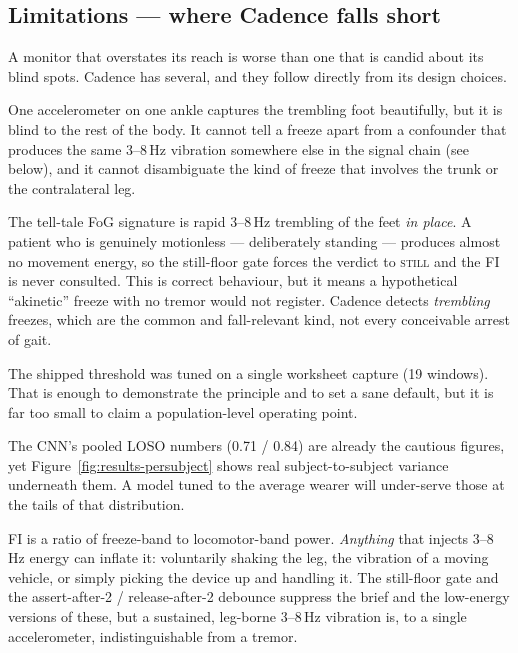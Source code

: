 \subsection{Limitations --- where Cadence falls short}

A monitor that overstates its reach is worse than one that is candid about its blind
spots. Cadence has several, and they follow directly from its design choices.

\begin{description}[leftmargin=1.2em,style=nextline]
\item[A single ankle sensor sees one thing.] One accelerometer on one ankle captures
the trembling foot beautifully, but it is blind to the rest of the body. It cannot tell
a freeze apart from a confounder that produces the same 3--8\,Hz vibration somewhere
else in the signal chain (see below), and it cannot disambiguate the kind of freeze
that involves the trunk or the contralateral leg.
\item[Standing still is not a freeze.] The tell-tale FoG signature is rapid 3--8\,Hz
trembling of the feet \emph{in place}. A patient who is genuinely motionless ---
deliberately standing --- produces almost no movement energy, so the still-floor gate
forces the verdict to \textsc{still} and the FI is never consulted. This is correct
behaviour, but it means a hypothetical ``akinetic'' freeze with no tremor would not
register. Cadence detects \emph{trembling} freezes, which are the common and
fall-relevant kind, not every conceivable arrest of gait.
\item[A small, personal dataset.] The shipped threshold was tuned on a single
worksheet capture (19 windows). That is enough to demonstrate the principle and to set
a sane default, but it is far too small to claim a population-level operating point.
\item[The LOSO generalisation gap.] The CNN's pooled LOSO numbers (0.71 / 0.84) are
already the cautious figures, yet Figure~\ref{fig:results-persubject} shows real
subject-to-subject variance underneath them. A model tuned to the average wearer will
under-serve those at the tails of that distribution.
\item[The Freeze Index has confounders.] FI is a ratio of freeze-band to locomotor-band
power. \emph{Anything} that injects 3--8\,Hz energy can inflate it: voluntarily shaking
the leg, the vibration of a moving vehicle, or simply picking the device up and handling
it. The still-floor gate and the assert-after-2 / release-after-2 debounce suppress the
brief and the low-energy versions of these, but a sustained, leg-borne 3--8\,Hz
vibration is, to a single accelerometer, indistinguishable from a tremor.
\end{description}

